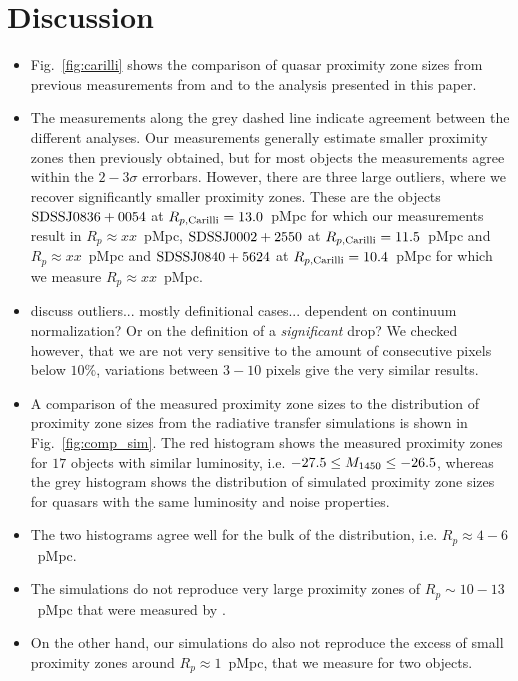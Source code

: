 \documentclass[iop]{emulateapj}
\begin{document}
\section{Discussion}\label{sec:discussion}

\begin{itemize}
\item Fig.~\ref{fig:carilli} shows the comparison of quasar proximity zone sizes from previous measurements from \citet{Carilli2010} and \citet{Venemans2015} to the analysis presented in this paper. 
\item The measurements along the grey dashed line indicate agreement between the different analyses. Our measurements generally estimate smaller proximity zones then previously obtained, but for most objects the measurements agree within the $2-3\sigma$ errorbars. However, there are three large outliers, where we recover significantly smaller proximity zones. These are the objects $\rm SDSS J0836+0054$ at $R_{p, \rm Carilli} = 13.0$~pMpc for which our measurements result in $R_p\approx xx$~pMpc, $\rm SDSS J0002+2550$ at $R_{p, \rm Carilli} = 11.5$~pMpc and $R_p\approx xx$~pMpc and $\rm SDSS J0840+5624$ at $R_{p, \rm Carilli} = 10.4$~pMpc for which we measure $R_p\approx xx$~pMpc. 
\item discuss outliers... mostly definitional cases... dependent on continuum normalization? Or on the definition of a \textit{significant} drop? We checked however, that we are not very sensitive to the amount of consecutive pixels below $10\%$, variations between $3-10$ pixels give the very similar results. 
\item A comparison of the measured proximity zone sizes to the distribution of proximity zone sizes from the radiative transfer simulations is shown in Fig.~\ref{fig:comp_sim}. The red histogram shows the measured proximity zones for $17$ objects with similar luminosity, i.e. $-27.5\leq M_{\rm 1450}\leq -26.5$, whereas the grey histogram shows the distribution of simulated proximity zone sizes for quasars with the same luminosity and noise properties. 
\item The two histograms agree well for the bulk of the distribution, i.e. $R_p\approx 4-6$~pMpc. 
\item The simulations do not reproduce very large proximity zones of $R_p\sim 10-13$~pMpc that were measured by \citet{Carilli2010}. 
\item On the other hand, our simulations do also not reproduce the excess of small proximity zones around $R_p\approx 1$~pMpc, that we measure for two objects. 

\end{itemize}
\end{document}
